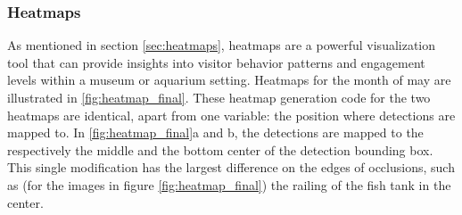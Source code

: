 \subsubsection{Heatmaps}
\label{sec:results_heatmaps}
As mentioned in section \ref{sec:heatmaps}, heatmaps are a powerful visualization tool that can provide insights into visitor behavior patterns and engagement levels within a museum or aquarium setting. Heatmaps for the month of may are illustrated in \ref{fig:heatmap_final}. These heatmap generation code for the two heatmaps are identical, apart from one variable: the position where detections are mapped to. In \ref{fig:heatmap_final}a and b, the detections are mapped to the respectively the middle and the bottom center of the detection bounding box. This single modification has the largest difference on the edges of occlusions, such as (for the images in figure \ref{fig:heatmap_final}) the railing of the fish tank in the center.

